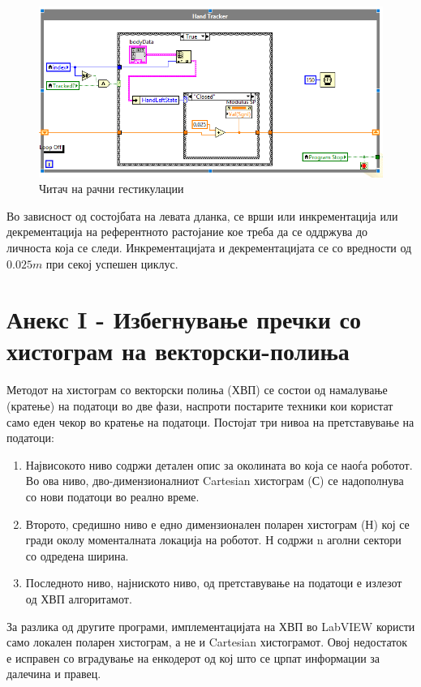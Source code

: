 \documentclass[12pt]{article}
\begin{document}
      \begin{figure}[H]
        \centering
        \includegraphics[width=0.85\linewidth]{./images/hand_control.png}
        \caption{Читач на рачни гестикулации}
        \end{figure}

      Во зависност од состојбата на левата дланка, се врши или инкрементација или декрементација на референтното растојание кое треба да се оддржува до личноста која се следи. Инкрементацијата и декрементацијата се со вредности од $0.025m$ при секој успешен циклус.

\newpage


\section{Анекс I - Избегнување пречки со хистограм на векторски-полиња} %
  \label{sec:app1-avoidance}
  Методот на хистограм со векторски полиња (ХВП) се состои од намалување (кратење) на податоци во две фази, наспроти постарите техники кои користат само еден чекор во кратење на податоци. Постојат три нивоа на претставување на податоци:

  \begin{enumerate}
    \item Највисокото ниво содржи детален опис за околината во која се наоѓа роботот. Во ова ниво, дво-димензионалниот Cartesian хистограм (С) се надополнува со нови податоци во реално време.
    \item Второто, средишно ниво е едно димензионален поларен хистограм (Н) кој се гради околу моменталната локација на роботот. Н содржи n аголни сектори со одредена ширина.
    \item Последното ниво, најниското ниво, од претставување на податоци е излезот од ХВП алгоритамот.
    \end{enumerate}

  За разлика од другите програми, имплементацијата на ХВП во LabVIEW користи само локален поларен хистограм, а не и Cartesian хистограмот. Овој недостаток е исправен со вградување на енкодерот од кој што се црпат информации за далечина и правец.
\end{document}
